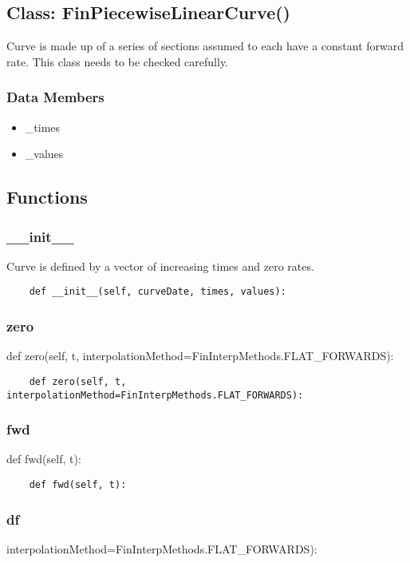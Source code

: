 \documentclass[twoside,11pt]{book}
\begin{document}
\subsection*{Class: FinPiecewiseLinearCurve()}
Curve is made up of a series of sections assumed to each have a constant forward rate. This class needs to be checked carefully.  

\subsubsection*{Data Members}
\begin{itemize}
\item{\_times}
\item{\_values}
\end{itemize}

\subsection*{Functions}

\subsubsection*{{\bf \_\_init\_\_}}
Curve is defined by a vector of increasing times and zero rates.  

\begin{lstlisting}
    def __init__(self, curveDate, times, values):
\end{lstlisting}

\subsubsection*{{\bf zero}}
def zero(self, t, interpolationMethod=FinInterpMethods.FLAT\_FORWARDS): 

\begin{lstlisting}
    def zero(self, t, interpolationMethod=FinInterpMethods.FLAT_FORWARDS):
\end{lstlisting}

\subsubsection*{{\bf fwd}}
def fwd(self, t): 

\begin{lstlisting}
    def fwd(self, t):
\end{lstlisting}

\subsubsection*{{\bf df}}
interpolationMethod=FinInterpMethods.FLAT\_FORWARDS): 
\end{document}
